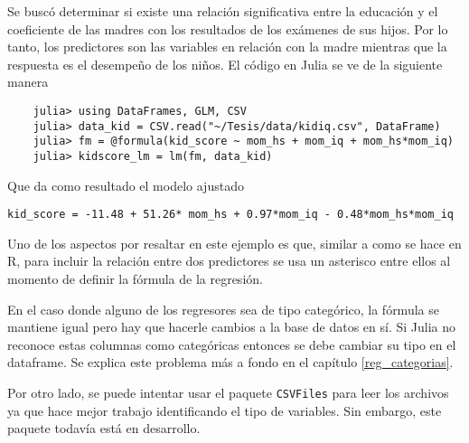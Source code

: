 Se buscó determinar si existe una relación significativa entre la educación y el coeficiente de las madres con los resultados de los exámenes de sus hijos. Por lo tanto, los predictores son las variables en relación con la madre mientras que la respuesta es el desempeño de los niños. El código en \textsf{Julia} se ve de la siguiente manera

\begin{verbatim}
    julia> using DataFrames, GLM, CSV
    julia> data_kid = CSV.read("~/Tesis/data/kidiq.csv", DataFrame)
    julia> fm = @formula(kid_score ~ mom_hs + mom_iq + mom_hs*mom_iq)
    julia> kidscore_lm = lm(fm, data_kid)
\end{verbatim}

Que da como resultado el modelo ajustado

\texttt{kid\_score = -11.48 + 51.26* mom\_hs + 0.97*mom\_iq - 0.48*mom\_hs*mom\_iq}

Uno de los aspectos por resaltar en este ejemplo es que, similar a como se hace en \textsf{R}, para incluir la relación entre dos predictores se usa un asterisco entre ellos al momento de definir la fórmula de la regresión. 

En el caso donde alguno de los regresores sea de tipo categórico, la fórmula se mantiene igual pero hay que hacerle cambios a la base de datos en sí. Si \textsf{Julia} no reconoce estas columnas como categóricas entonces se debe cambiar su tipo en el dataframe. Se explica este problema más a fondo en el capítulo \ref{reg_categorias}. 

Por otro lado, se puede intentar usar el paquete \texttt{CSVFiles} para leer los archivos ya que hace mejor trabajo identificando el tipo de variables. Sin embargo, este paquete todavía está en desarrollo. 
